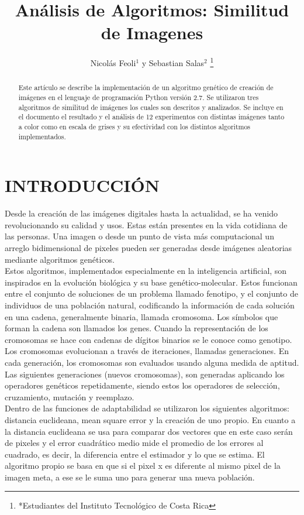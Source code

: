 \documentclass[letterpaper, 10 pt, conference]{ieeeconf}  %
\title{\LARGE \bf
An\'alisis de Algoritmos: Similitud de Imagenes
}
\author{Nicol\'as Feoli$^{1}$ y Sebastian Salas$^{2}$%
\thanks{*Estudiantes del Instituto Tecnológico de Costa Rica}%
}
\begin{document}
\maketitle
\thispagestyle{empty}
\pagestyle{empty}

\begin{abstract}

Este art\'iculo se describe la implementaci\'on de un algoritmo gen\'etico de creaci\'on de im\'agenes en el lenguaje de programaci\'on Python versi\'on 2.7. Se utilizaron tres algoritmos de similitud de im\'agenes los cuales son descritos y analizados. Se incluye en el documento el resultado y el an\'alisis de 12 experimentos con distintas im\'agenes tanto a color como en escala de grises y su efectividad con los distintos algoritmos implementados.
\end{abstract}


\section{\textbf{INTRODUCCI\'ON}}

Desde la creaci\'on de las im\'agenes digitales hasta la actualidad, se ha venido revolucionando su calidad y usos. Estas est\'an presentes en la vida cotidiana de las personas. Una imagen o desde un punto de vista m\'as computacional un arreglo bidimensional de pixeles pueden ser generadas desde im\'agenes aleatorias mediante algoritmos gen\'eticos.\\
\indent Estos algoritmos, implementados especialmente en la inteligencia artificial, son inspirados en la evoluci\'on biol\'ogica y su base gen\'etico-molecular. Estos  funcionan entre el conjunto de soluciones de un problema llamado fenotipo, y el conjunto de individuos de una poblaci\'on natural, codificando la informaci\'on de cada soluci\'on en una cadena, generalmente binaria, llamada cromosoma. Los s\'imbolos que forman la cadena son llamados los genes. Cuando la representaci\'on de los cromosomas se hace con cadenas de d\'igitos binarios se le conoce como genotipo. \\ 
\indent Los cromosomas evolucionan a trav\'es de iteraciones, llamadas generaciones. En cada generaci\'on, los cromosomas son evaluados usando alguna medida de aptitud. Las siguientes generaciones (nuevos cromosomas), son generadas aplicando los operadores gen\'eticos repetidamente, siendo estos los operadores de selecci\'on, cruzamiento, mutaci\'on y reemplazo.\\ 
\indent Dentro de las funciones de adaptabilidad se utilizaron los siguientes algoritmos: distancia euclideana, mean square error y la creaci\'on de uno propio. En cuanto a la distancia euclideana se usa para comparar dos vectores que en este caso ser\'an de pixeles y el error cuadr\'atico medio mide el promedio de los errores al cuadrado, es decir, la diferencia entre el estimador y lo que se estima. El algoritmo propio se basa en que si el pixel x es diferente al mismo pixel de la imagen meta, a ese se le suma uno para generar una nueva poblaci\'on. 
\end{document}
